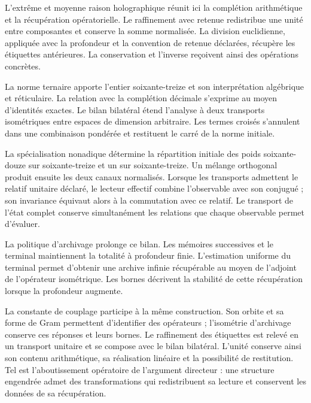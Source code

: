 
L’extrême et moyenne raison holographique réunit ici la complétion
arithmétique et la récupération opératorielle. Le raffinement avec retenue
redistribue une unité entre composantes et conserve la somme
normalisée. La division euclidienne, appliquée avec la profondeur et
la convention de retenue déclarées, récupère les étiquettes
antérieures. La conservation et l’inverse reçoivent ainsi des opérations
concrètes.

La norme ternaire apporte l'entier soixante-treize et son interprétation algébrique et réticulaire. La relation avec la complétion décimale s'exprime au moyen d'identités exactes. Le bilan bilatéral étend l'analyse à deux transports isométriques entre espaces de dimension arbitraire. Les termes croisés s'annulent dans une combinaison pondérée et restituent le carré de la norme initiale.

La spécialisation nonadique détermine la répartition initiale des poids
soixante-douze sur soixante-treize et un sur soixante-treize.
Un mélange orthogonal produit ensuite les deux canaux normalisés.
Lorsque les transports admettent le relatif unitaire déclaré,
le lecteur effectif combine l’observable avec son conjugué ; son
invariance équivaut alors à la commutation avec ce relatif. Le transport
de l’état complet conserve simultanément les relations
que chaque observable permet d’évaluer.

La politique d’archivage prolonge ce bilan. Les mémoires
successives et le terminal maintiennent la totalité à profondeur
finie. L’estimation uniforme du terminal permet d’obtenir
une archive infinie récupérable au moyen de l’adjoint de l’opérateur
isométrique. Les bornes décrivent la stabilité de cette récupération
lorsque la profondeur augmente.

La constante de couplage participe à la même construction. Son orbite et sa forme de Gram permettent d'identifier des opérateurs ; l'isométrie d'archivage conserve ces réponses et leurs bornes. Le raffinement des étiquettes est relevé en un transport unitaire et se compose avec le bilan bilatéral. L'unité conserve ainsi son contenu arithmétique, sa réalisation linéaire et la possibilité de restitution. Tel est l'aboutissement opératoire de l'argument directeur : une structure engendrée admet des transformations qui redistribuent sa lecture et conservent les données de sa récupération.
